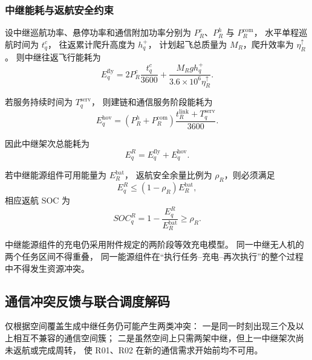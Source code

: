 \subsubsection{中继能耗与返航安全约束}

设中继巡航功率、悬停功率和通信附加功率分别为
$P_R^{c}$、$P_R^{h}$ 与 $P_R^{\mathrm{com}}$，
水平单程巡航时间为 $t_q^{c}$，
往返累计爬升高度为 $h_q^{+}$，
计划起飞总质量为 $M_R$，爬升效率为 $\eta_R^{\uparrow}$。
则中继往返飞行能耗为
\begin{equation}
	E_q^{\mathrm{fly}}
	=
	2P_R^c\frac{t_q^{c}}{3600}
	+
	\frac{M_Rgh_q^{+}}
	{3.6\times10^6\eta_R^{\uparrow}}.
	\label{eq:q3-relay-flight-energy}
\end{equation}

若服务持续时间为 $T_q^{\mathrm{serv}}$，
则建链和通信服务阶段能耗为
\begin{equation}
	E_q^{\mathrm{hov}}
	=
	\left(P_R^h+P_R^{\mathrm{com}}\right)
	\frac{t_R^{\mathrm{link}}+T_q^{\mathrm{serv}}}{3600}.
	\label{eq:q3-relay-hover-energy}
\end{equation}

因此中继架次总能耗为
\begin{equation}
	E_q^R
	=E_q^{\mathrm{fly}}+E_q^{\mathrm{hov}}.
	\label{eq:q3-relay-total-energy}
\end{equation}

若中继能源组件可用能量为 $E_R^{\mathrm{bat}}$，
返航安全余量比例为 $\rho_R$，则必须满足
\begin{equation}
	E_q^R\le
	(1-\rho_R)E_R^{\mathrm{bat}},
	\label{eq:q3-relay-reserve}
\end{equation}
相应返航 SOC 为
\begin{equation}
	SOC_q^{R}
	=1-\frac{E_q^R}{E_R^{\mathrm{bat}}}
	\ge \rho_R.
	\label{eq:q3-relay-soc}
\end{equation}

中继能源组件的充电仍采用附件规定的两阶段等效充电模型。
同一中继无人机的两个任务区间不得重叠，
同一能源组件在“执行任务--充电--再次执行”的整个过程中不得发生资源冲突。

\subsection{通信冲突反馈与联合调度解码}

仅根据空间覆盖生成中继任务仍可能产生两类冲突：
一是同一时刻出现三个及以上相互不兼容的通信空间簇；
二是虽然空间上只需两架中继，但上一中继架次尚未返航或完成周转，
使 R01、R02 在新的通信需求开始前均不可用。

